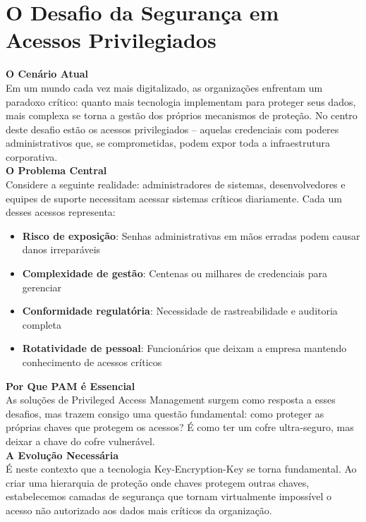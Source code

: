 \documentclass{article}
\begin{document}
\section{O Desafio da Segurança em Acessos Privilegiados}

\textbf{\large O Cenário Atual}\\

Em um mundo cada vez mais digitalizado, as organizações enfrentam um paradoxo crítico: quanto mais tecnologia implementam para proteger seus dados, mais complexa se torna a gestão dos próprios mecanismos de proteção. No centro deste desafio estão os acessos privilegiados – aquelas credenciais com poderes administrativos que, se comprometidas, podem expor toda a infraestrutura corporativa.\\

\textbf{\large O Problema Central}\\

Considere a seguinte realidade: administradores de sistemas, desenvolvedores e equipes de suporte necessitam acessar sistemas críticos diariamente. Cada um desses acessos representa:

\begin{itemize}
  \item \textbf{Risco de exposição}: Senhas administrativas em mãos erradas podem causar danos irreparáveis
  \item \textbf{Complexidade de gestão}: Centenas ou milhares de credenciais para gerenciar
  \item \textbf{Conformidade regulatória}: Necessidade de rastreabilidade e auditoria completa
  \item \textbf{Rotatividade de pessoal}: Funcionários que deixam a empresa mantendo conhecimento de acessos críticos
\end{itemize}

\textbf{\large Por Que PAM é Essencial}\\

As soluções de Privileged Access Management surgem como resposta a esses desafios, mas trazem consigo uma questão fundamental: como proteger as próprias chaves que protegem os acessos? É como ter um cofre ultra-seguro, mas deixar a chave do cofre vulnerável.\\

\textbf{\large A Evolução Necessária}\\

É neste contexto que a tecnologia Key-Encryption-Key se torna fundamental. Ao criar uma hierarquia de proteção onde chaves protegem outras chaves, estabelecemos camadas de segurança que tornam virtualmente impossível o acesso não autorizado aos dados mais críticos da organização.\\
\end{document}
